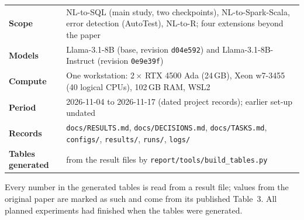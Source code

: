 \begin{titlepage}
\vspace{1.0cm}
\begin{tcolorbox}[enhanced,colback=rowshade,colframe=headshade,boxrule=0.5pt,arc=2pt,left=10pt,right=10pt,top=8pt,bottom=8pt]
\sffamily\small
\begin{tabularx}{\linewidth}{@{}>{\bfseries\color{navy}}l X@{}}
Scope & NL-to-SQL (main study, two checkpoints), NL-to-Spark-Scala, error detection (AutoTest), NL-to-R; four extensions beyond the paper \\
Models & Llama-3.1-8B (base, revision \texttt{d04e592}) and Llama-3.1-8B-Instruct (revision \texttt{0e9e39f}) \\
Compute & One workstation: 2\,$\times$ RTX 4500 Ada (24\,GB), Xeon w7-3455 (40 logical CPUs), 102\,GB RAM, WSL2 \\
Period & 2026-11-04 to 2026-11-17 (dated project records); earlier set-up undated \\
Records & \texttt{docs/RESULTS.md}, \texttt{docs/DECISIONS.md}, \texttt{docs/TASKS.md}, \texttt{configs/},
          \texttt{results/}, \texttt{runs/}, \texttt{logs/} \\
Tables generated & \tablesgenerated{} from the result files by \texttt{report/tools/build\_tables.py} \\
\end{tabularx}
\end{tcolorbox}

\vfill
{\sffamily\footnotesize\color{slate} Every number in the generated tables is read from a result file; values from the
original paper are marked as such and come from its published Table~3. All planned experiments had
finished when the tables were generated.}
\end{titlepage}
